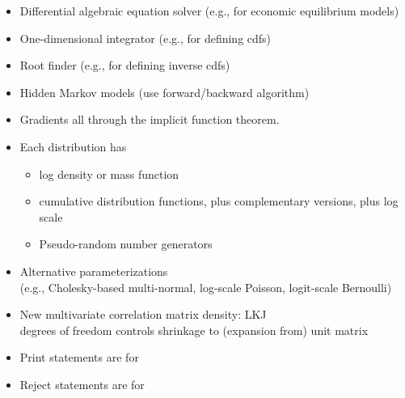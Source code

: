 \documentclass[10pt]{report}
\begin{document}
\begin{itemize}
\item Differential algebraic equation solver (e.g., for economic equilibrium models)
\item One-dimensional integrator (e.g., for defining cdfs)
\item Root finder (e.g., for defining inverse cdfs) 
\item Hidden Markov models (use forward/backward algorithm)
  \vfill
\item Gradients all through the implicit function theorem.
\end{itemize}

%
\begin{itemize}
\item Each distribution has
  \vspace*{-4pt}
  \begin{itemize}\small
  \item log density or mass function
  \item cumulative distribution functions, plus complementary versions,
    plus log scale
  \item Pseudo-random number generators
  \end{itemize}
\item Alternative parameterizations
  \\
  {\footnotesize (e.g., Cholesky-based multi-normal,
    log-scale Poisson, logit-scale Bernoulli)}
\item New multivariate correlation matrix density: LKJ
  \\
  {\footnotesize degrees of freedom controls
    shrinkage to (expansion from) unit matrix}
\end{itemize}


%
\begin{itemize}
\item Print statements are for 
\item Reject statements are for 
\end{itemize}
\end{document}
